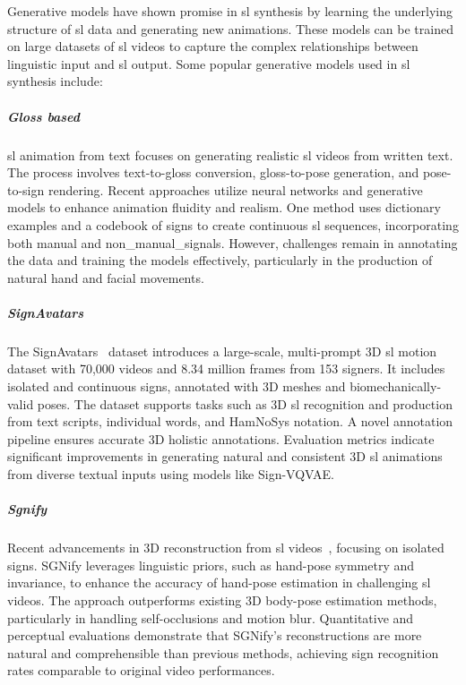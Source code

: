 \documentclass[../../main.tex]{subfiles}
\begin{document}
Generative models have shown promise in \gls{sl} synthesis by learning the underlying structure of \gls{sl} data and generating new animations. These models can be trained on large datasets of \gls{sl} videos to capture the complex relationships between linguistic input and \gls{sl} output. Some popular generative models used in \gls{sl} synthesis include:

\subparagraph{Gloss based}
\label{ch:background_work:sign_language_synthesis:3d_techniques:sign_language_synthesis_systems:synthesis_based_on_generative_models:gloss_based}

\gls{sl} animation from text focuses on generating realistic \gls{sl} videos from written text. The process involves text-to-gloss conversion, gloss-to-pose generation, and pose-to-sign rendering. Recent approaches utilize neural networks and generative models to enhance animation fluidity and realism. One method uses dictionary examples and a codebook of signs to create continuous \gls{sl} sequences, incorporating both \gls{manual} and \gls{non_manual_signals}. However, challenges remain in annotating the data and training the models effectively, particularly in the production of natural hand and facial movements.

\subparagraph{SignAvatars}
\label{ch:background_work:sign_language_synthesis:3d_techniques:sign_language_synthesis_systems:synthesis_based_on_generative_models:signavatars}

The SignAvatars~\cite{yu2023signavatars} dataset introduces a large-scale, multi-prompt 3D \gls{sl} motion dataset with 70,000 videos and 8.34 million frames from 153 signers. It includes isolated and continuous signs, annotated with 3D meshes and biomechanically-valid poses. The dataset supports tasks such as 3D \gls{sl} recognition and production from text scripts, individual words, and HamNoSys notation. A novel annotation pipeline ensures accurate 3D holistic annotations. Evaluation metrics indicate significant improvements in generating natural and consistent 3D \gls{sl} animations from diverse textual inputs using models like Sign-VQVAE.

\subparagraph{Sgnify}
\label{ch:background_work:sign_language_synthesis:3d_techniques:sign_language_synthesis_systems:synthesis_based_on_generative_models:sgnify}

Recent advancements in 3D reconstruction from \gls{sl} videos~\cite{Forte_2023_CVPR}, focusing on isolated signs. SGNify leverages linguistic priors, such as hand-pose symmetry and invariance, to enhance the accuracy of hand-pose estimation in challenging \gls{sl} videos. The approach outperforms existing 3D body-pose estimation methods, particularly in handling self-occlusions and motion blur. Quantitative and perceptual evaluations demonstrate that SGNify's reconstructions are more natural and comprehensible than previous methods, achieving sign recognition rates comparable to original video performances.
\end{document}
